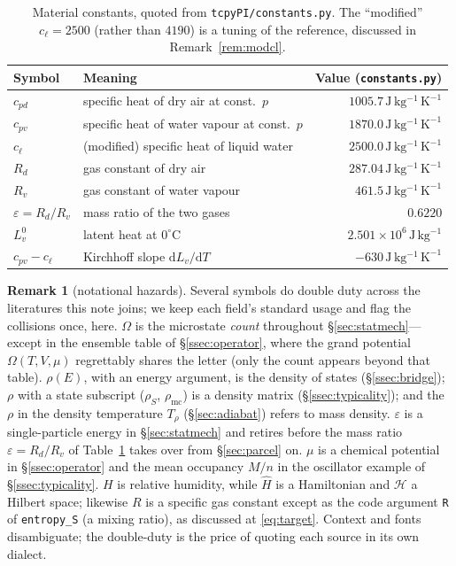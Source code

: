 \documentclass[11pt,a4paper]{article}
\theoremstyle{definition}
\newtheorem{remark}{Remark}
\newcommand{\Jkg}{\,\mathrm{J\,kg^{-1}}}
\newcommand{\JkgK}{\,\mathrm{J\,kg^{-1}\,K^{-1}}}
\newcommand{\Rd}{R_d}
\newcommand{\Rv}{R_v}
\newcommand{\cpd}{c_{pd}}
\newcommand{\cpv}{c_{pv}}
\newcommand{\cl}{c_\ell}
\newcommand{\Lv}{L_v}
\newcommand{\eps}{\varepsilon}
\newcommand{\dd}{\mathrm{d}}
\newcommand{\Trho}{T_\rho}
\begin{document}
\begin{table}[htb]
\centering
\small
\begin{tabular}{llr}
\toprule
Symbol & Meaning & Value (\texttt{constants.py})\\
\midrule
$\cpd$ & specific heat of dry air at const.\ $p$ & $1005.7\JkgK$\\
$\cpv$ & specific heat of water vapour at const.\ $p$ & $1870.0\JkgK$\\
$\cl$  & (modified) specific heat of liquid water & $2500.0\JkgK$\\
$\Rd$  & gas constant of dry air & $287.04\JkgK$\\
$\Rv$  & gas constant of water vapour & $461.5\JkgK$\\
$\eps=\Rd/\Rv$ & mass ratio of the two gases & $0.6220$\\
$\Lv^{0}$ & latent heat at $0^{\circ}$C & $2.501\times10^{6}\Jkg$\\
$\cpv-\cl$ & Kirchhoff slope $\dd\Lv/\dd T$ & $-630\JkgK$\\
\bottomrule
\end{tabular}
\caption{Material constants, quoted from \texttt{tcpyPI/constants.py}. The
``modified'' $\cl=2500$ (rather than $4190$) is a tuning of the reference,
discussed in Remark~\ref{rem:modcl}.}
\label{tab:const}
\end{table}

\begin{remark}[notational hazards]\label{rem:notation}
Several symbols do double duty across the literatures this note joins; we keep
each field's standard usage and flag the collisions once, here. $\Omega$ is the
microstate \emph{count} throughout \S\ref{sec:statmech}---except in the ensemble
table of \S\ref{ssec:operator}, where the grand potential $\Omega(T,V,\mu)$
regrettably shares the letter (only the count appears beyond that table).
$\rho(E)$, with an energy argument, is the density of states
(\S\ref{ssec:bridge}); $\rho$ with a state subscript ($\rho_S$,
$\rho_{\mathrm{mc}}$) is a density matrix (\S\ref{ssec:typicality}); and the
$\rho$ in the density temperature $\Trho$ (\S\ref{sec:adiabat}) refers to mass
density. $\varepsilon$ is a single-particle energy in \S\ref{sec:statmech} and
retires before the mass ratio $\eps=\Rd/\Rv$ of Table~\ref{tab:const} takes over
from \S\ref{sec:parcel} on. $\mu$ is a chemical potential in
\S\ref{ssec:operator} and the mean occupancy $M/n$ in the oscillator example of
\S\ref{ssec:typicality}. $H$ is relative humidity, while $\hat H$ is a
Hamiltonian and $\mathcal H$ a Hilbert space; likewise $R$ is a specific gas
constant except as the code argument \texttt{R} of \texttt{entropy\_S} (a mixing
ratio), as discussed at \eqref{eq:target}. Context and fonts disambiguate; the
double-duty is the price of quoting each source in its own dialect.
\end{remark}
\end{document}
